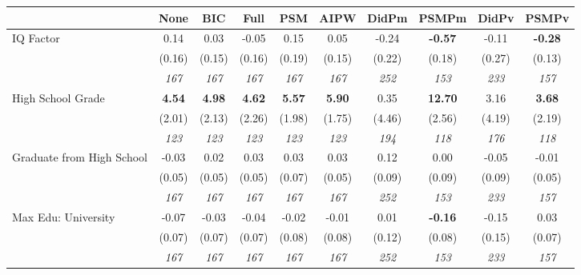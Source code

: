 \begin{tabular}{l c c c c c c c c c}
\toprule
 & None & BIC & Full & PSM & AIPW & DidPm & PSMPm & DidPv & PSMPv \\
\midrule
IQ Factor & 0.14 & 0.03 & -0.05 & 0.15 & 0.05 & -0.24 & \textbf{-0.57} & -0.11 & \textbf{-0.28} \\
& (0.16) & (0.15) & (0.16) & (0.19) & (0.15) & (0.22) & (0.18) & (0.27) & (0.13) \\
& \textit{ 167 } & \textit{ 167 } & \textit{ 167 } & \textit{ 167 } & \textit{ 167 } & \textit{ 252 } & \textit{ 153 } & \textit{ 233 } & \textit{ 157 } \\
High School Grade & \textbf{ 4.54 } & \textbf{ 4.98 } & \textbf{ 4.62 } & \textbf{5.57} & \textbf{5.90} & 0.35 & \textbf{12.70} & 3.16 & \textbf{3.68} \\
& (2.01) & (2.13) & (2.26) & (1.98) & (1.75) & (4.46) & (2.56) & (4.19) & (2.19) \\
& \textit{ 123 } & \textit{ 123 } & \textit{ 123 } & \textit{ 123 } & \textit{ 123 } & \textit{ 194 } & \textit{ 118 } & \textit{ 176 } & \textit{ 118 } \\
Graduate from High School & -0.03 & 0.02 & 0.03 & 0.03 & 0.03 & 0.12 & 0.00 & -0.05 & -0.01 \\
& (0.05) & (0.05) & (0.05) & (0.07) & (0.05) & (0.09) & (0.09) & (0.09) & (0.05) \\
& \textit{ 167 } & \textit{ 167 } & \textit{ 167 } & \textit{ 167 } & \textit{ 167 } & \textit{ 252 } & \textit{ 153 } & \textit{ 233 } & \textit{ 157 } \\
Max Edu: University & -0.07 & -0.03 & -0.04 & -0.02 & -0.01 & 0.01 & \textbf{-0.16} & -0.15 & 0.03 \\
& (0.07) & (0.07) & (0.07) & (0.08) & (0.08) & (0.12) & (0.08) & (0.15) & (0.07) \\
& \textit{ 167 } & \textit{ 167 } & \textit{ 167 } & \textit{ 167 } & \textit{ 167 } & \textit{ 252 } & \textit{ 153 } & \textit{ 233 } & \textit{ 157 } \\
\bottomrule
\end{tabular}
